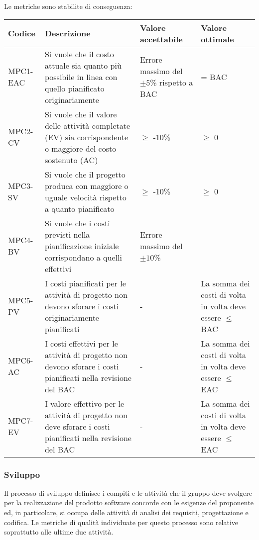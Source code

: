 \newpage
Le metriche sono stabilite di conseguenza:
\begin{table}[h!]
\centering
\def\arraystretch{1.5}
\begin{tabular}{ |>{\centering\arraybackslash}m{2.5cm}|>{\centering\arraybackslash}m{5.5cm}|>{\centering\arraybackslash}m{3cm}|>{\centering\arraybackslash}m{3cm}| }
\hline
\rowcolor{black}
\textbf{\color{white} Codice} & \textbf{\color{white} Descrizione} & \textbf{\color{white} Valore accettabile} & \textbf{\color{white} Valore ottimale}\\
\hline
MPC1-EAC & Si vuole che il costo attuale sia quanto più possibile in linea con quello pianificato originariamente & Errore massimo del $\pm 5$\% rispetto a BAC & = BAC \\
\hline
MPC2-CV & Si vuole che il valore delle attività completate (EV) sia corrispondente o maggiore del costo sostenuto (AC) & $\geq$ -10\% & $\geq$ 0 \\
\hline
MPC3-SV & Si vuole che il progetto produca con maggiore o uguale velocità rispetto a quanto pianificato & $\geq$ -10\% & $\geq$ 0 \\
\hline
MPC4-BV & Si vuole che i costi previsti nella pianificazione iniziale corrispondano a quelli effettivi & Errore massimo del $\pm 10$\% & 0 \\
\hline
MPC5-PV & I costi pianificati per le attività di progetto non devono sforare i costi originariamente pianificati & - & La somma dei costi di volta in volta deve essere $\leq$ BAC \\
\hline
MPC6-AC & I costi effettivi per le attività di progetto non devono sforare i costi pianificati nella revisione del BAC & - & La somma dei costi di volta in volta deve essere $\leq$ EAC \\
\hline
MPC7-EV & I valore effettivo per le attività di progetto non deve sforare i costi pianificati nella revisione del BAC & - & La somma dei costi di volta in volta deve essere $\leq$ EAC \\
\hline
\end{tabular}
\end{table}

\subsubsection{Sviluppo}
Il processo di sviluppo definisce i compiti e le attività che il gruppo deve svolgere per la
realizzazione del prodotto software concorde con le esigenze del proponente ed, in particolare, si occupa delle attività di analisi dei requisiti, progettazione e codifica. Le metriche di qualità individuate per questo processo sono relative soprattutto alle ultime due attività.
